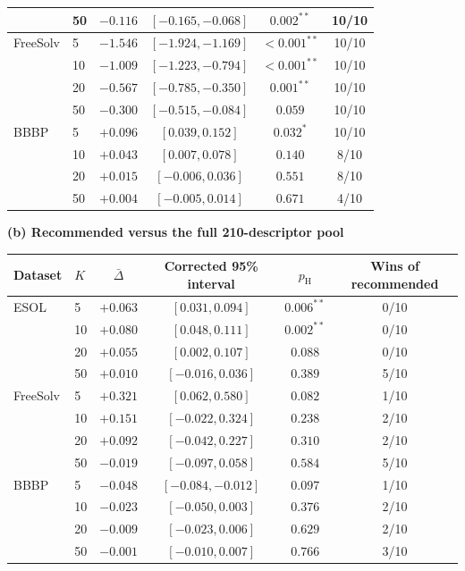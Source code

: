 \documentclass[10pt,a4paper]{article}
\begin{document}
\begin{table}[H]
\begin{tabular}{@{}llcccc@{}}
 & 50 & $-0.116$ & $[-0.165,-0.068]$ & $0.002^{**}$ & 10/10 \\
\midrule
FreeSolv & 5 & $-1.546$ & $[-1.924,-1.169]$ & $<0.001^{**}$ & 10/10 \\
 & 10 & $-1.009$ & $[-1.223,-0.794]$ & $<0.001^{**}$ & 10/10 \\
 & 20 & $-0.567$ & $[-0.785,-0.350]$ & $0.001^{**}$ & 10/10 \\
 & 50 & $-0.300$ & $[-0.515,-0.084]$ & $0.059$ & 10/10 \\
\midrule
BBBP & 5 & $+0.096$ & $[0.039,0.152]$ & $0.032^{*}$ & 10/10 \\
 & 10 & $+0.043$ & $[0.007,0.078]$ & $0.140$ & 8/10 \\
 & 20 & $+0.015$ & $[-0.006,0.036]$ & $0.551$ & 8/10 \\
 & 50 & $+0.004$ & $[-0.005,0.014]$ & $0.671$ & 4/10 \\
\bottomrule
\end{tabular}

\medskip\textbf{(b) Recommended versus the full 210-descriptor pool}\par\smallskip
\begin{tabular}{@{}llcccc@{}}
\toprule
Dataset & $K$ & $\bar\Delta$ & Corrected 95\% interval & $p_{\mathrm{H}}$ & Wins of recommended \\
\midrule
ESOL & 5 & $+0.063$ & $[0.031,0.094]$ & $0.006^{**}$ & 0/10 \\
 & 10 & $+0.080$ & $[0.048,0.111]$ & $0.002^{**}$ & 0/10 \\
 & 20 & $+0.055$ & $[0.002,0.107]$ & $0.088$ & 0/10 \\
 & 50 & $+0.010$ & $[-0.016,0.036]$ & $0.389$ & 5/10 \\
\midrule
FreeSolv & 5 & $+0.321$ & $[0.062,0.580]$ & $0.082$ & 1/10 \\
 & 10 & $+0.151$ & $[-0.022,0.324]$ & $0.238$ & 2/10 \\
 & 20 & $+0.092$ & $[-0.042,0.227]$ & $0.310$ & 2/10 \\
 & 50 & $-0.019$ & $[-0.097,0.058]$ & $0.584$ & 5/10 \\
\midrule
BBBP & 5 & $-0.048$ & $[-0.084,-0.012]$ & $0.097$ & 1/10 \\
 & 10 & $-0.023$ & $[-0.050,0.003]$ & $0.376$ & 2/10 \\
 & 20 & $-0.009$ & $[-0.023,0.006]$ & $0.629$ & 2/10 \\
 & 50 & $-0.001$ & $[-0.010,0.007]$ & $0.766$ & 3/10 \\
\bottomrule
\end{tabular}
\end{table}
\end{document}
